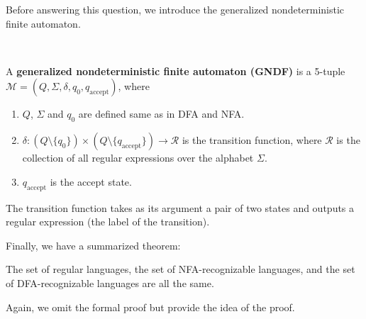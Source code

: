 Before answering this question, we introduce the generalized nondeterministic finite automaton.
\begin{definition} ~

A \textbf{generalized nondeterministic finite automaton (GNDF)} is a 5-tuple \\ $\mathcal{M} = (Q,\Sigma,\delta,q_\text{0}, q_\text{accept})$, where
\begin{enumerate}
    \item $Q$, $\Sigma$ and $q_0$ are defined same as in DFA and NFA.
    \item $\delta: (Q\setminus \{ q_0 \}) \times (Q\setminus \{ q_\text{accept} \}) \to \mathcal{R}$ is the transition function, where $\mathcal{R}$ is the collection of all regular expressions over the alphabet $\Sigma$.
    \item $q_\text{accept}$ is the accept state.
\end{enumerate}
\end{definition}
\begin{remark}
    The transition function takes as its argument a pair of two states and outputs a regular expression (the label of the transition).
\end{remark}

Finally, we have a summarized theorem:
\begin{theorem}
    The set of regular languages, the set of NFA-recognizable languages, and the set of DFA-recognizable languages are all the same.
\end{theorem}

Again, we omit the formal proof but provide the idea of the proof.

